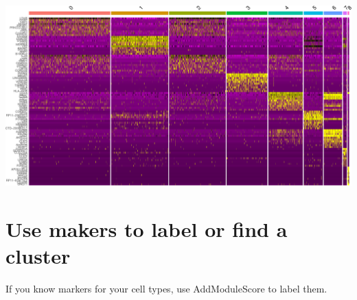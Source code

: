 \documentclass[
]{book}
\begin{document}
\includegraphics{scRNAseqInR_Doco_files/figure-latex/clusterHeatmap-1.pdf}

\section{Use makers to label or find a cluster}\label{use-makers-to-label-or-find-a-cluster}

If you know markers for your cell types, use AddModuleScore to label them.
\end{document}
